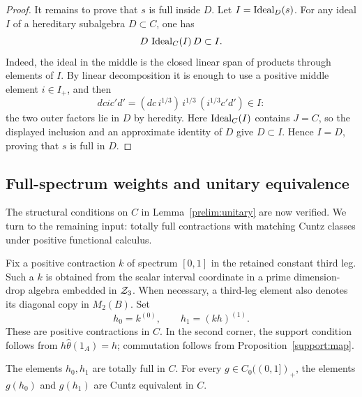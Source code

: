 \begin{proof}
It remains to prove that $s$ is full inside $D$.  Let
$I=\operatorname{Ideal}_D(s)$.  For any ideal $I$ of a hereditary
subalgebra $D\subset C$, one has
\[
 D\,\operatorname{Ideal}_C(I)\,D\subset I.
\]
Indeed, the ideal in the middle is the closed linear span of
products through elements of $I$.  By linear decomposition it is
enough to use a positive middle element $i\in I_+$, and then
\[
 dci c'd'
   =(dc\,i^{1/3})\,i^{1/3}\,(i^{1/3}c'd')\in I:
\]
the two outer factors lie in $D$ by heredity.
Here $\operatorname{Ideal}_C(I)$ contains $J=C$, so the displayed inclusion
and an approximate identity of $D$ give $D\subset I$.
Hence $I=D$, proving that $s$ is full in $D$.
\end{proof}

\subsection{Full-spectrum weights and unitary equivalence}

The structural conditions on $C$ in Lemma~\ref{prelim:unitary} are now
verified.  We turn to the remaining input: totally full contractions
with matching Cuntz classes under positive functional calculus.

Fix a positive contraction $k$ of spectrum $[0,1]$ in the retained
constant third leg.  Such a $k$ is obtained from the scalar interval
coordinate in a prime dimension-drop algebra embedded in $\mathcal Z_3$.
When necessary, a third-leg element also denotes its diagonal
copy in $M_2(B)$.  Set
\begin{equation}\label{conjugacy:weights}
 h_0=k^{(0)},\qquad h_1=(kh)^{(1)}.
\end{equation}
These are positive contractions in $C$.  In the second corner,
the support condition follows from
$h\widehat\theta(1_A)=h$; commutation follows from
Proposition~\ref{support:map}.

\begin{proposition}\label{conjugacy:functions}
The elements $h_0,h_1$ are totally full in $C$.  For every
$g\in C_0((0,1])_+$, the elements $g(h_0)$ and $g(h_1)$ are
Cuntz equivalent in $C$.
\end{proposition}

